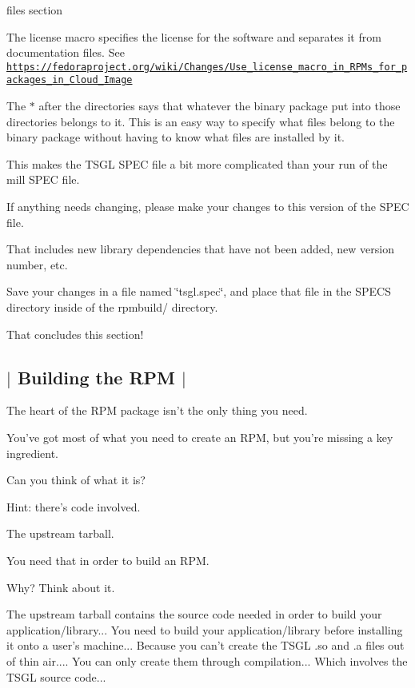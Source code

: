 \begin{DoxyItemize}
\begin{DoxyItemize}
\end{DoxyItemize}
\item {\ttfamily files} section
\begin{DoxyItemize}
\item The {\ttfamily license} macro specifies the license for the software and separates it from documentation files. See \href{https://fedoraproject.org/wiki/Changes/Use_license_macro_in_RPMs_for_packages_in_Cloud_Image}{\tt https\-://fedoraproject.\-org/wiki/\-Changes/\-Use\-\_\-license\-\_\-macro\-\_\-in\-\_\-\-R\-P\-Ms\-\_\-for\-\_\-packages\-\_\-in\-\_\-\-Cloud\-\_\-\-Image}
\item The {\ttfamily $\ast$} after the directories says that whatever the binary package put into those directories belongs to it. This is an easy way to specify what files belong to the binary package without having to know what files are installed by it.
\end{DoxyItemize}
\end{DoxyItemize}

This makes the T\-S\-G\-L S\-P\-E\-C file a bit more complicated than your run of the mill S\-P\-E\-C file.

If anything needs changing, please make your changes to this version of the S\-P\-E\-C file.

That includes new library dependencies that have not been added, new version number, etc.

Save your changes in a file named \char`\"{}tsgl.\-spec\char`\"{}, and place that file in the S\-P\-E\-C\-S directory inside of the rpmbuild/ directory.

That concludes this section! 

 \subsection*{$\vert$ Building the R\-P\-M $\vert$ }

The heart of the R\-P\-M package isn't the only thing you need.

You've got most of what you need to create an R\-P\-M, but you're missing a key ingredient.

Can you think of what it is?

Hint\-: there's code involved.

The upstream tarball.

You need that in order to build an R\-P\-M.

Why? Think about it.

The upstream tarball contains the source code needed in order to build your application/library... You need to build your application/library before installing it onto a user's machine... Because you can't create the T\-S\-G\-L .so and .a files out of thin air.... You can only create them through compilation... Which involves the T\-S\-G\-L source code...


